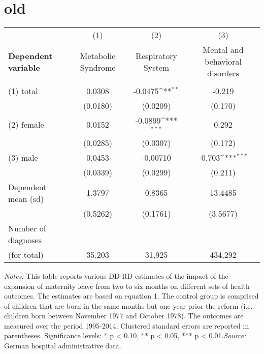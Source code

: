 \documentclass{scrartcl} %
\begin{document}
\newpage \newpage
\section{old}
 \begin{table}[H]
 \begin{threeparttable} \centering 
 {\def\sym#1{\ifmmode^{#1}\else\(^{#1}\)\fi} 
 

\begin{tabular}{lccc}
\toprule
&\multicolumn{1}{c}{(1)}&\multicolumn{1}{c}{(2)}&\multicolumn{1}{c}{(3)}\\
\textbf{Dependent variable} & Metabolic Syndrome & Respiratory System & Mental and behavioral disorders \\ 
\midrule
\\
(1) {total} & 0.0308 & -0.0475\sym{**} & -0.219 \\ 
  & (0.0180) & (0.0209) & (0.170) \\ 
(2) {female} & 0.0152 & -0.0899\sym{***} & 0.292 \\  
 & (0.0285) & (0.0307) & (0.172) \\ 
(3) {male} & 0.0453 & -0.00710 & -0.703\sym{***} \\ 
& (0.0339) & (0.0299) & (0.211) \\
\midrule
Dependent mean (sd)&	1.3797	& 0.8365 & 13.4485 \\
& (0.5262) 		& (0.1761) & (3.5677) \\
Number of diagnoses  \\
(for total)& 35,203 & 31,925 & 434,292 \\
\bottomrule
\end{tabular}}
\begin{tablenotes} \item \scriptsize \emph{Notes:} This table reports various DD-RD estimates of the impact of the expansion of maternity leave from two to six months on different sets of health outcomes. The estimates are based on equation 1. The control group is comprised of children that are born in the same months but one year prior the reform (i.e. children born between November 1977 and October 1978). The outcomes are measured over the period 1995-2014. Clustered standard errors are reported in parentheses. Significance levels: * p < 0.10, ** p < 0.05, *** p < 0.01.\newline \emph{Source:} German hospital administrative data. \end{tablenotes} \end{threeparttable} \end{table} 
\end{document}

